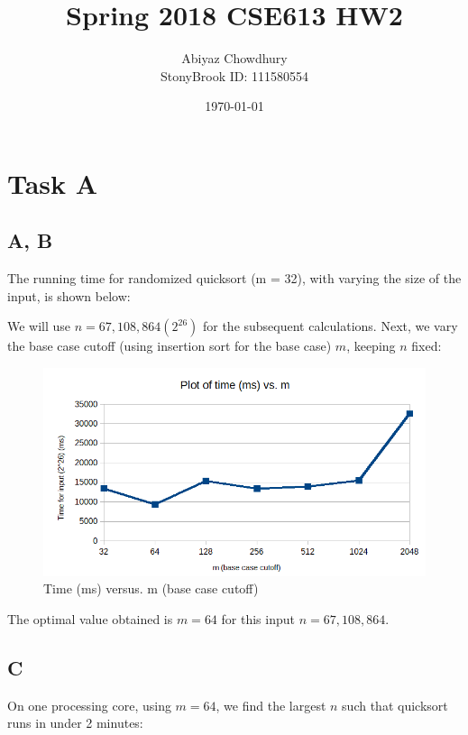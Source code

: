 \documentclass[a4paper]{article}
\title{\textbf{Spring 2018 CSE613 HW2}}
\author{Abiyaz Chowdhury\\ StonyBrook ID: 111580554}
\date{\today}
\begin{document}
\maketitle
\section*{Task A}
\subsection*{A, B}

The running time for randomized quicksort (m = 32), with varying  the size of the input, is shown below:


We will use $n = 67,108,864 (2^{26})$ for the subsequent calculations. Next, we vary the base case cutoff (using insertion sort for the base case) $m$, keeping $n$ fixed:

    \begin{figure}[H]
    \centering
    \includegraphics{graph1.png}
    \centering
    \caption{Time (ms) versus. m (base case cutoff) }
\end{figure} 
    
The optimal value obtained is $m = 64$ for this input $n = 67,108,864 $. 

\subsection*{C}

On one processing core, using $m = 64$, we find the largest $n$ such that quicksort runs in under 2 minutes:

    
\end{document}
